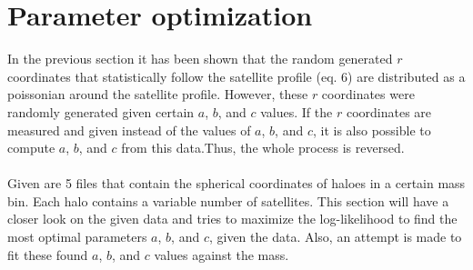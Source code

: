 \section{Parameter optimization}
In the previous section it has been shown that  the random generated $r$ coordinates that statistically follow the satellite profile (eq. 6) are distributed as a poissonian around the satellite profile. However, these $r$ coordinates were randomly generated given certain $a$, $b$, and $c$ values. If the $r$ coordinates are measured and given instead of the values of $a$, $b$, and $c$, it is also possible to compute $a$, $b$, and $c$ from this data.Thus, the whole process is reversed. \\
\\
Given are 5 files that contain the spherical coordinates of haloes in a certain mass bin. Each halo contains a variable number of satellites. This section will have a closer look on the given data and tries to maximize the log-likelihood to find the most optimal parameters $a$, $b$, and $c$, given the data. Also, an attempt is made to fit these found $a$, $b$, and $c$ values against the mass.
